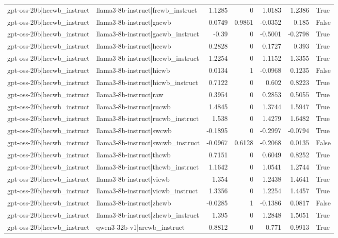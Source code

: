 \begin{table}
\begin{tabular}{l l r r r r l}
gpt-oss-20b|hecwb_instruct & llama3-8b-instruct|frcwb_instruct & 1.1285 & 0 & 1.0183 & 1.2386 & True \\
gpt-oss-20b|hecwb_instruct & llama3-8b-instruct|gacwb & 0.0749 & 0.9861 & -0.0352 & 0.185 & False \\
gpt-oss-20b|hecwb_instruct & llama3-8b-instruct|gacwb_instruct & -0.39 & 0 & -0.5001 & -0.2798 & True \\
gpt-oss-20b|hecwb_instruct & llama3-8b-instruct|hecwb & 0.2828 & 0 & 0.1727 & 0.393 & True \\
gpt-oss-20b|hecwb_instruct & llama3-8b-instruct|hecwb_instruct & 1.2254 & 0 & 1.1152 & 1.3355 & True \\
gpt-oss-20b|hecwb_instruct & llama3-8b-instruct|hicwb & 0.0134 & 1 & -0.0968 & 0.1235 & False \\
gpt-oss-20b|hecwb_instruct & llama3-8b-instruct|hicwb_instruct & 0.7122 & 0 & 0.602 & 0.8223 & True \\
gpt-oss-20b|hecwb_instruct & llama3-8b-instruct|raw & 0.3954 & 0 & 0.2853 & 0.5055 & True \\
gpt-oss-20b|hecwb_instruct & llama3-8b-instruct|rucwb & 1.4845 & 0 & 1.3744 & 1.5947 & True \\
gpt-oss-20b|hecwb_instruct & llama3-8b-instruct|rucwb_instruct & 1.538 & 0 & 1.4279 & 1.6482 & True \\
gpt-oss-20b|hecwb_instruct & llama3-8b-instruct|swcwb & -0.1895 & 0 & -0.2997 & -0.0794 & True \\
gpt-oss-20b|hecwb_instruct & llama3-8b-instruct|swcwb_instruct & -0.0967 & 0.6128 & -0.2068 & 0.0135 & False \\
gpt-oss-20b|hecwb_instruct & llama3-8b-instruct|thcwb & 0.7151 & 0 & 0.6049 & 0.8252 & True \\
gpt-oss-20b|hecwb_instruct & llama3-8b-instruct|thcwb_instruct & 1.1642 & 0 & 1.0541 & 1.2744 & True \\
gpt-oss-20b|hecwb_instruct & llama3-8b-instruct|vicwb & 1.354 & 0 & 1.2438 & 1.4641 & True \\
gpt-oss-20b|hecwb_instruct & llama3-8b-instruct|vicwb_instruct & 1.3356 & 0 & 1.2254 & 1.4457 & True \\
gpt-oss-20b|hecwb_instruct & llama3-8b-instruct|zhcwb & -0.0285 & 1 & -0.1386 & 0.0817 & False \\
gpt-oss-20b|hecwb_instruct & llama3-8b-instruct|zhcwb_instruct & 1.395 & 0 & 1.2848 & 1.5051 & True \\
gpt-oss-20b|hecwb_instruct & qwen3-32b-v1|arcwb_instruct & 0.8812 & 0 & 0.771 & 0.9913 & True \\

\end{tabular}
\end{table}

